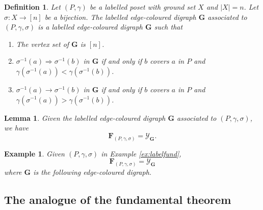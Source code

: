 \documentclass[11pt]{amsart}
\newtheorem{Lemma}[Theorem]{Lemma}
\newtheorem{Example}[Theorem]{Example}
\newtheorem{Definition}[Theorem]{Definition}
\numberwithin{equation}{section}
\newcommand{\bfF}{{\mathbf{F}}}
\newcommand{\scrY}{{\mathscr{Y}}}
\newcommand{\bfone}{{\mathbf{1}}}
\newcommand{\bftwo}{{\mathbf{2}}}
\newcommand{\bfthree}{{\mathbf{3}}}
\newcommand{\bffour}{{\mathbf{4}}}
\newcommand{\bfG}{{\mathbf{G}}}
\begin{document}
\begin{Definition} 
Let $(P,\gamma)$ be a labelled poset with ground set $X$ and $|X|=n$. Let $\sigma:X\to[n]$ be a bijection. The labelled edge-coloured digraph $\bfG$ associated to $(P,\gamma,\sigma)$  is a labelled edge-coloured digraph $\bfG$ such that 
\begin{enumerate}
\item The vertex set of $\bfG$ is $[n]$.
\item $\sigma^{-1}(a) \Rightarrow \sigma^{-1}(b)$ in $\bfG$ if and only if $b$ covers $a$ in $P$ and $\gamma(\sigma^{-1}(a))< \gamma(\sigma^{-1}(b))$.
\item $\sigma^{-1}(a) \rightarrow \sigma^{-1}(b)$ in $\bfG$ if and only if $b$ covers $a$ in $P$ and $\gamma(\sigma^{-1}(a))> \gamma(\sigma^{-1}(b))$.
 \end{enumerate} 
\end{Definition} 

\begin{Lemma}\label{Def:PosetGraph}
 Given the labelled edge-coloured digraph $\bfG$ associated to $(P,\gamma,\sigma)$, we have 
 $$\bfF_{(P,\gamma,\sigma)}=\scrY_\bfG.$$
 \end{Lemma} 

 
 \begin{Example}\label{ex:PosetGraph}
Given $(P,\gamma, \sigma)$ in  Example \ref{ex:labelfund},
 $$\bfF_{(P,\gamma,\sigma)}=\scrY_\bfG$$ where $\bfG$ is the following edge-coloured digraph. 
 \begin{center} 
  \end{center} 


 
 \end{Example} 


\subsection{The analogue of the fundamental theorem}\label{subsec:fund-thm-n}
\end{document}
